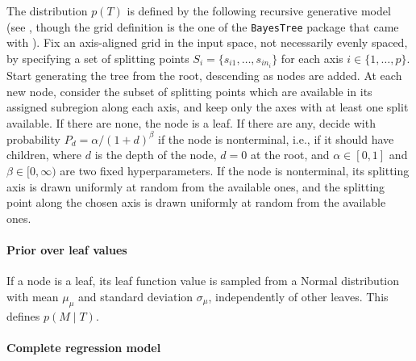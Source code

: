 \documentclass{article}
\begin{document}
The distribution $p(T)$ is defined by the following recursive generative model
(see \cite{chipman1998}, though the grid definition is the one of the \texttt{BayesTree} package that came with \cite{chipman2006,chipman2010}). Fix an axis-aligned grid in the input space, not necessarily
evenly spaced, by specifying a set of splitting points $S_i = \{s_{i1}, \ldots,
	s_{in_i}\}$ for each axis $i \in \{1,\ldots,p\}$. Start generating the tree from the
root, descending as nodes are added. At each new node, consider the subset of splitting
points which are available in its assigned subregion along each axis, and keep only the
axes with at least one split available. If there are none, the node is a leaf. If there
are any, decide with probability $P_d = \alpha/(1 + d)^\beta$ if the node is nonterminal,
i.e., if it should have children, where $d$ is the depth of the node, $d=0$ at the root,
and $\alpha \in [0, 1]$ and $\beta \in [0,\infty)$ are two fixed hyperparameters. If the
node is nonterminal, its splitting axis is drawn uniformly at random from the available
ones, and the splitting point along the chosen axis is drawn uniformly at random from the
available ones.

\paragraph{Prior over leaf values}

If a node is a leaf, its leaf function value is sampled from a Normal distribution with
mean $\mu_\mu$ and standard deviation $\sigma_\mu$, independently of other leaves. This
defines $p(M\mid T)$.

\paragraph{Complete regression model}
\end{document}
